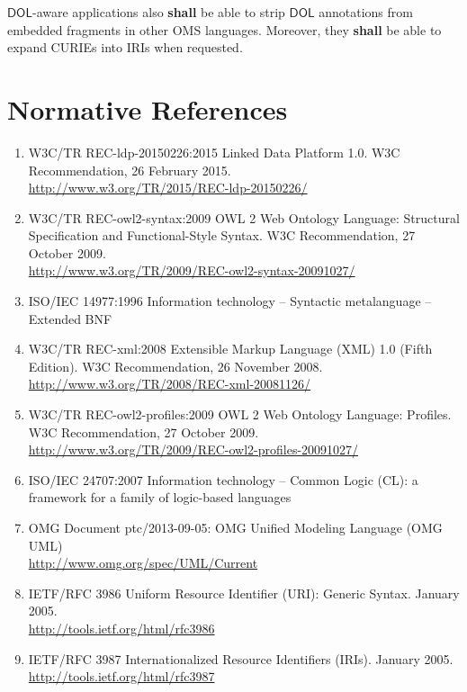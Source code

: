 \documentclass[10pt,fleqn,final]{scrreprt}
\newcommand{\cbs}[0]{\color{red}\xspace} %
\newcommand{\cbe}[0]{\color{black}\xspace} %
\newcommand*{\shall}{\textbf{shall}\xspace}
\newcommand*{\DOL}{\ensuremath{\mathsf{DOL}}\xspace}
\newcommand{\clause}[1]{\chapter{#1}}
\begin{document}
\DOL-aware applications also \cbs \shall \cbe be able to strip \DOL annotations
from embedded fragments in other OMS languages. Moreover, they \cbs \shall \cbe
be able to expand CURIEs into IRIs when requested.


\clause{Normative References}
\begin{enumerate}[label=\bfseries NR\arabic*:]
  \item{W3C/TR REC-ldp-20150226:2015} {Linked Data Platform 1.0. W3C Recommendation, 26 February 2015.\\ \url{http://www.w3.org/TR/2015/REC-ldp-20150226/}}
  \item{W3C/TR REC-owl2-syntax:2009} {OWL 2 Web Ontology Language: Structural Specification and Functional-Style Syntax. W3C Recommendation, 27 October 2009.\\ \url{http://www.w3.org/TR/2009/REC-owl2-syntax-20091027/}}
  \item{ISO/IEC 14977:1996} {Information technology – Syntactic metalanguage – Extended BNF}
  \item{W3C/TR REC-xml:2008} {Extensible Markup Language (XML) 1.0 (Fifth Edition). W3C Recommendation, 26 November 2008. \\
  \url{http://www.w3.org/TR/2008/REC-xml-20081126/}}
  \item{W3C/TR REC-owl2-profiles:2009} {OWL 2 Web Ontology Language: Profiles. W3C Recommendation, 27 October 2009. \\
  \url{http://www.w3.org/TR/2009/REC-owl2-profiles-20091027/}}
  \item{ISO/IEC 24707:2007} {Information technology – Common Logic (CL): a framework for a family of logic-based languages}
  \item{OMG Document ptc/2013-09-05:} {OMG Unified Modeling Language (OMG UML)\\
  \cbs\url{http://www.omg.org/spec/UML/Current}}\cbe
  \item{IETF/RFC 3986} {Uniform Resource Identifier (URI): Generic Syntax. January 2005.\\ \url{http://tools.ietf.org/html/rfc3986}}
  \item{IETF/RFC 3987} {Internationalized Resource Identifiers (IRIs). January 2005.\\ \url{http://tools.ietf.org/html/rfc3987}}

\end{enumerate}
\end{document}
